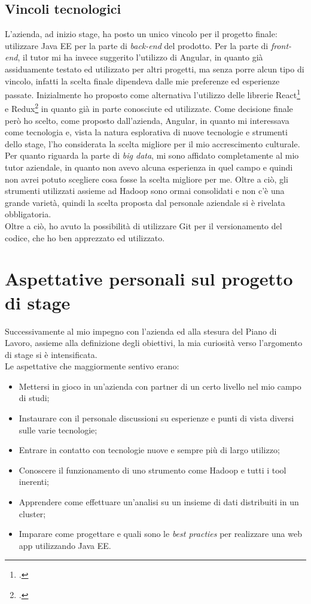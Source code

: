 \subsection{Vincoli tecnologici}
L'azienda, ad inizio stage, ha posto un unico vincolo per il progetto finale: utilizzare Java EE per la parte di \textit{back-end} del prodotto. Per la parte di \textit{front-end}, il tutor mi ha invece suggerito l'utilizzo di Angular, in quanto già assiduamente testato ed utilizzato per altri progetti, ma senza porre alcun tipo di vincolo, infatti la scelta finale dipendeva dalle mie preferenze ed esperienze passate. Inizialmente ho proposto come alternativa l'utilizzo delle librerie React\footcite{https://reactjs.org/} e Redux\footcite{https://redux.js.org/} in quanto già in parte conosciute ed utilizzate. Come decisione finale però ho scelto, come proposto dall'azienda, Angular, in  quanto mi interessava come tecnologia e, vista la natura esplorativa di nuove tecnologie e strumenti dello stage, l'ho considerata la scelta migliore per il mio accrescimento culturale. \\
Per quanto riguarda la parte di \textit{big data}, mi sono affidato completamente al mio tutor aziendale, in quanto non avevo alcuna esperienza in quel campo e quindi non avrei potuto scegliere cosa fosse la scelta migliore per me. Oltre a ciò, gli strumenti utilizzati assieme ad Hadoop sono ormai consolidati e non c'è una grande varietà, quindi la scelta proposta dal personale aziendale si è rivelata obbligatoria. \\
Oltre a ciò, ho avuto la possibilità di utilizzare \gls{Git} per il versionamento del codice, che ho ben apprezzato ed utilizzato.

\section{Aspettative personali sul progetto di stage}
Successivamente al mio impegno con l'azienda ed alla stesura del Piano di Lavoro, assieme alla definizione degli obiettivi, la mia curiosità verso l'argomento di stage si è intensificata. \\
Le aspettative che maggiormente sentivo erano:
\begin{itemize}
	\item Mettersi in gioco in un'azienda con partner di un certo livello nel mio campo di studi;
	\item Instaurare con il personale discussioni su esperienze e punti di vista diversi sulle varie tecnologie;
	\item Entrare in contatto con tecnologie nuove e sempre più di largo utilizzo;
	\item Conoscere il funzionamento di uno strumento come Hadoop e tutti i tool inerenti;
	\item Apprendere come effettuare un'analisi su un insieme di dati distribuiti in un \gls{cluster};
	\item Imparare come progettare e quali sono le \textit{best practies} per realizzare una \gls{web app} utilizzando Java EE.
\end{itemize}